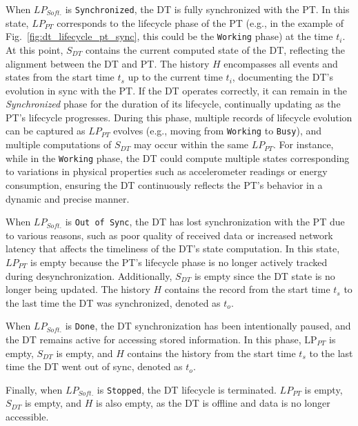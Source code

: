When $LP_{Soft.}$  is \texttt{Synchronized}, the DT is fully synchronized with the PT. In this state, $LP_{PT}$ corresponds to the lifecycle phase of the PT (e.g., in the example of Fig.~\ref{fig:dt_lifecycle_pt_sync}, this could be the \texttt{Working} phase) at the time $t_i$.
At this point, $S_{DT}$ contains the current computed state of the DT, reflecting the alignment between the DT and PT.
The history $H$ encompasses all events and states from the start time $t_{s}$ up to the current time $t_{i}$, documenting the DT's evolution in sync with the PT.
If the DT operates correctly, it can remain in the \textit{Synchronized} phase for the duration of its lifecycle, continually updating as the PT's lifecycle progresses.
During this phase, multiple records of lifecycle evolution can be captured as $LP_{PT}$ evolves (e.g., moving from \texttt{Working} to \texttt{Busy}), and multiple computations of $S_{DT}$ may occur within the same $LP_{PT}$.
For instance, while in the \texttt{Working} phase, the DT could compute multiple states corresponding to variations in physical properties such as accelerometer readings or energy consumption, ensuring the DT continuously reflects the PT's behavior in a dynamic and precise manner.

When $LP_{Soft.}$ is \texttt{Out of Sync}, the DT has lost synchronization with the PT due to various reasons, such as poor quality of received data or increased network latency that affects the timeliness of the DT's state computation. In this state, $LP_{PT}$ is empty because the PT's lifecycle phase is no longer actively tracked during desynchronization. Additionally, $S_{DT}$ is empty since the DT state is no longer being updated. The history $H$ contains the record from the start time $t_{s}$ to the last time the DT was synchronized, denoted as $t_{o}$.

When $LP_{Soft.}$ is \texttt{Done}, the DT synchronization has been intentionally paused, and the DT remains active for accessing stored information. In this phase, $\text{LP}_{PT}$ is empty, $S_{DT}$ is empty, and $H$ contains the history from the start time $t_{s}$ to the last time the DT went out of sync, denoted as $t_{o}$.

Finally, when $LP_{Soft.}$ is \texttt{Stopped}, the DT lifecycle is terminated. $LP_{PT}$ is empty, $S_{DT}$ is empty, and $H$ is also empty, as the DT is offline and data is no longer accessible.



